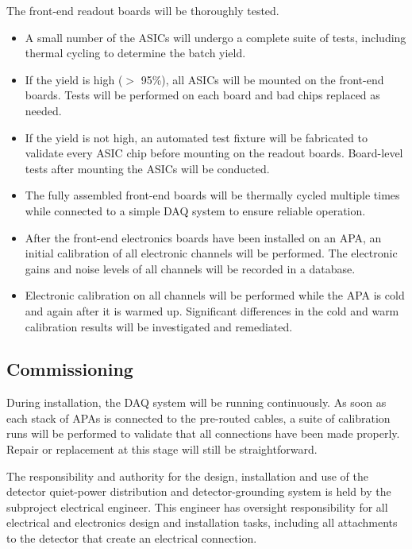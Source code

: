 The front-end readout boards will be thoroughly tested.
\begin{itemize}
\item A small number of the ASICs will undergo a complete suite 
of tests, including thermal cycling to determine the batch yield.
\item If the yield is high ($>$ 95\%), all ASICs will be mounted 
on the front-end boards.
Tests will be performed on each board and bad chips replaced as needed.
\item If the yield is not high, an automated test fixture will be 
fabricated to validate every ASIC chip before mounting on the readout boards.
Board-level tests after mounting the ASICs will be conducted.
\item The fully assembled front-end boards will be thermally cycled multiple times while connected
to a simple DAQ system to ensure reliable operation.
\item After the front-end electronics boards have been installed on an APA,
an initial calibration of all electronic channels will be performed.
The electronic gains and noise levels of all channels will be recorded in a database.
\item Electronic calibration on all channels will be performed while the APA is cold and again after it is warmed up.
Significant differences in the cold and warm calibration results will be investigated and remediated.  
\end{itemize}

%
\subsection{Commissioning } 
\label{sec:ce-install-commission}

During installation, the DAQ system will be running continuously.
As soon as each stack of APAs is connected to the pre-routed cables, 
a suite of calibration runs will be performed to validate that all connections have been made properly.
Repair or replacement at this stage will still be straightforward.

The responsibility and authority for the design, installation 
and use of the detector quiet-power distribution and 
detector-grounding system is held by the subproject electrical engineer. 
This engineer has oversight responsibility for all electrical and electronics 
design and installation tasks, including all attachments to the detector 
that create an electrical connection. 

%

